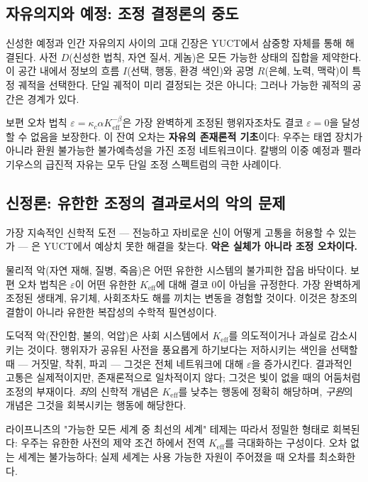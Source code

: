 \documentclass[12pt,a4paper]{article}
\begin{document}
	\subsection{자유의지와 예정: 조정 결정론의 중도}
	
	신성한 예정과 인간 자유의지 사이의 고대 긴장은 YUCT에서 삼중항 자체를 통해 해결된다. 사전 \(D\)(신성한 법칙, 자연 질서, 게놈)은 모든 가능한 상태의 집합을 제약한다. 이 공간 내에서 정보의 흐름 \(I\)(선택, 행동, 환경 색인)와 공명 \(R\)(은혜, 노력, 맥락)이 특정 궤적을 선택한다. 단일 궤적이 미리 결정되는 것은 아니다; 그러나 가능한 궤적의 공간은 경계가 있다.
	
	보편 오차 법칙 \(\varepsilon = \kappa_c \alpha K_{\mathrm{eff}}^{-\beta}\)은 가장 완벽하게 조정된 행위자조차도 결코 \(\varepsilon = 0\)을 달성할 수 없음을 보장한다. 이 잔여 오차는 \textbf{자유의 존재론적 기초}이다: 우주는 태엽 장치가 아니라 환원 불가능한 불가예측성을 가진 조정 네트워크이다. 칼뱅의 이중 예정과 펠라기우스의 급진적 자유는 모두 단일 조정 스펙트럼의 극한 사례이다.
	
	\subsection{신정론: 유한한 조정의 결과로서의 악의 문제}
	
	가장 지속적인 신학적 도전 — 전능하고 자비로운 신이 어떻게 고통을 허용할 수 있는가 — 은 YUCT에서 예상치 못한 해결을 찾는다. \textbf{악은 실체가 아니라 조정 오차이다.}
	
	물리적 악(자연 재해, 질병, 죽음)은 어떤 유한한 시스템의 불가피한 잡음 바닥이다. 보편 오차 법칙은 \(\varepsilon\)이 어떤 유한한 \(K_{\mathrm{eff}}\)에 대해 결코 0이 아님을 규정한다. 가장 완벽하게 조정된 생태계, 유기체, 사회조차도 해를 끼치는 변동을 경험할 것이다. 이것은 창조의 결함이 아니라 유한한 복잡성의 수학적 필연성이다.
	
	도덕적 악(잔인함, 불의, 억압)은 사회 시스템에서 \(K_{\mathrm{eff}}\)를 의도적이거나 과실로 감소시키는 것이다. 행위자가 공유된 사전을 풍요롭게 하기보다는 저하시키는 색인을 선택할 때 — 거짓말, 착취, 파괴 — 그것은 전체 네트워크에 대해 \(\varepsilon\)을 증가시킨다. 결과적인 고통은 실제적이지만, 존재론적으로 일차적이지 않다; 그것은 빛이 없을 때의 어둠처럼 조정의 부재이다. \emph{죄}의 신학적 개념은 \(K_{\mathrm{eff}}\)를 낮추는 행동에 정확히 해당하며, \emph{구원}의 개념은 그것을 회복시키는 행동에 해당한다.
	
	라이프니츠의 "가능한 모든 세계 중 최선의 세계" 테제는 따라서 정밀한 형태로 회복된다: 우주는 유한한 사전의 제약 조건 하에서 전역 \(K_{\mathrm{eff}}\)를 극대화하는 구성이다. 오차 없는 세계는 불가능하다; 실제 세계는 사용 가능한 자원이 주어졌을 때 오차를 최소화한다.
	
\end{document}
